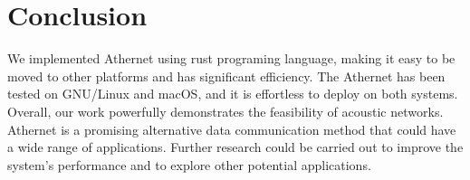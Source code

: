 \section{Conclusion}
We implemented Athernet using rust programing language, making it easy to be moved to other platforms and has significant efficiency. The Athernet has been tested on GNU/Linux and macOS, and it is effortless to deploy on both systems. Overall, our work powerfully demonstrates the feasibility of acoustic networks. Athernet is a promising alternative data communication method that could have a wide range of applications. Further research could be carried out to improve the system's performance and to explore other potential applications.